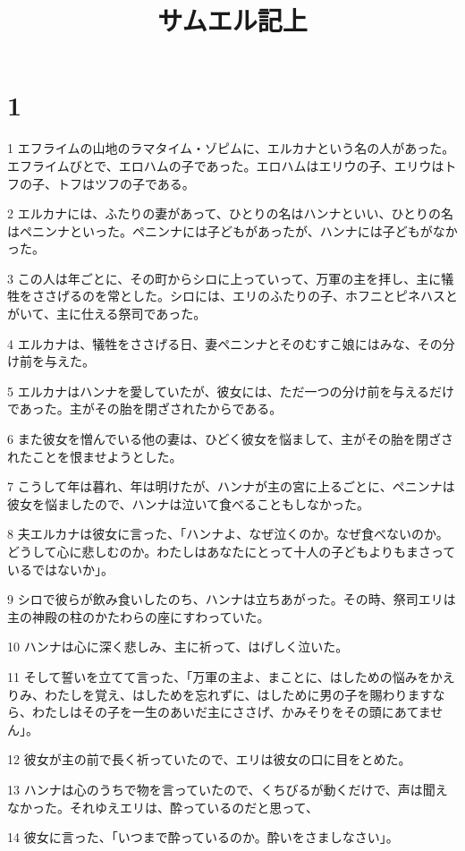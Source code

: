 

\title{サムエル記上}


\chapter{1}

\par 1 エフライムの山地のラマタイム・ゾピムに、エルカナという名の人があった。エフライムびとで、エロハムの子であった。エロハムはエリウの子、エリウはトフの子、トフはツフの子である。
\par 2 エルカナには、ふたりの妻があって、ひとりの名はハンナといい、ひとりの名はペニンナといった。ペニンナには子どもがあったが、ハンナには子どもがなかった。
\par 3 この人は年ごとに、その町からシロに上っていって、万軍の主を拝し、主に犠牲をささげるのを常とした。シロには、エリのふたりの子、ホフニとピネハスとがいて、主に仕える祭司であった。
\par 4 エルカナは、犠牲をささげる日、妻ペニンナとそのむすこ娘にはみな、その分け前を与えた。
\par 5 エルカナはハンナを愛していたが、彼女には、ただ一つの分け前を与えるだけであった。主がその胎を閉ざされたからである。
\par 6 また彼女を憎んでいる他の妻は、ひどく彼女を悩まして、主がその胎を閉ざされたことを恨ませようとした。
\par 7 こうして年は暮れ、年は明けたが、ハンナが主の宮に上るごとに、ペニンナは彼女を悩ましたので、ハンナは泣いて食べることもしなかった。
\par 8 夫エルカナは彼女に言った、「ハンナよ、なぜ泣くのか。なぜ食べないのか。どうして心に悲しむのか。わたしはあなたにとって十人の子どもよりもまさっているではないか」。
\par 9 シロで彼らが飲み食いしたのち、ハンナは立ちあがった。その時、祭司エリは主の神殿の柱のかたわらの座にすわっていた。
\par 10 ハンナは心に深く悲しみ、主に祈って、はげしく泣いた。
\par 11 そして誓いを立てて言った、「万軍の主よ、まことに、はしための悩みをかえりみ、わたしを覚え、はしためを忘れずに、はしために男の子を賜わりますなら、わたしはその子を一生のあいだ主にささげ、かみそりをその頭にあてません」。
\par 12 彼女が主の前で長く祈っていたので、エリは彼女の口に目をとめた。
\par 13 ハンナは心のうちで物を言っていたので、くちびるが動くだけで、声は聞えなかった。それゆえエリは、酔っているのだと思って、
\par 14 彼女に言った、「いつまで酔っているのか。酔いをさましなさい」。
